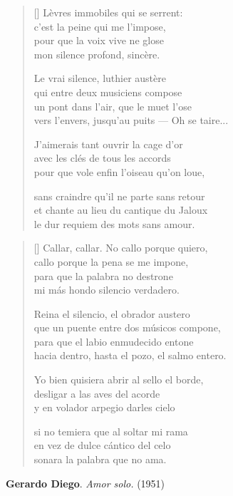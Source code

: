 



\settowidth{\versewidth}{vers l'envers, jusqu'au puits --- Oh se taire...}

\bigskip

\begin{verse}[\versewidth]
Lèvres immobiles qui se serrent: \\
c'est la peine qui me l'impose, \\
pour que la voix vive ne glose \\
mon silence profond, sincère.

Le vrai silence, luthier austère \\
qui entre deux musiciens compose \\
un pont dans l'air, que le muet l'ose \\
vers l'envers, jusqu'au puits --- Oh se taire...

J'aimerais tant ouvrir la cage d'or \\
avec les clés de tous les accords \\
pour que vole enfin l'oiseau qu'on loue,

sans craindre qu'il ne parte sans retour \\
et chante au lieu du cantique du Jaloux \\
le dur requiem des mots sans amour.
\end{verse}

\bigskip \bigskip



\settowidth{\versewidth}{hacia dentro, hasta el pozo, el salmo entero.}

\bigskip

\begin{verse}[\versewidth]
Callar, callar. No callo porque quiero, \\
callo porque la pena se me impone, \\
para que la palabra no destrone \\
mi más hondo silencio verdadero.

Reina el silencio, el obrador austero \\
que un puente entre dos músicos compone, \\
para que el labio enmudecido entone \\
hacia dentro, hasta el pozo, el salmo entero.

Yo bien quisiera abrir al sello el borde, \\
desligar a las aves del acorde \\
y en volador arpegio darles cielo

si no temiera que al soltar mi rama \\
en vez de dulce cántico del celo \\
sonara la palabra que no ama.
\end{verse}

\bigskip \bigskip

\hspace*{25mm} {\bf Gerardo Diego}. {\em Amor solo.} (1951)
